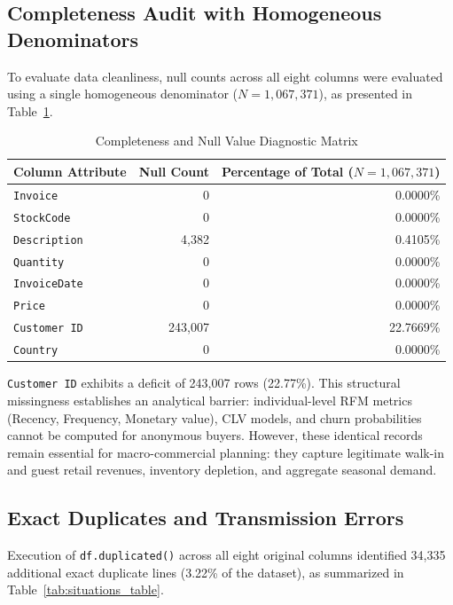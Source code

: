 \documentclass[journal,10pt,twocolumn]{IEEEtran}
\begin{document}
\subsection{Completeness Audit with Homogeneous Denominators}
To evaluate data cleanliness, null counts across all eight columns were evaluated using a single homogeneous denominator ($N = 1,067,371$), as presented in Table~\ref{tab:null_diagnostics}.

\begin{table}[htbp]
\caption{Completeness and Null Value Diagnostic Matrix}
\label{tab:null_diagnostics}
\centering
\begin{tabularx}{\columnwidth}{Xrr}
\toprule
\textbf{Column Attribute} & \textbf{Null Count} & \textbf{Percentage of Total ($N = 1,067,371$)} \\
\midrule
\texttt{Invoice} & 0 & 0.0000\% \\
\texttt{StockCode} & 0 & 0.0000\% \\
\texttt{Description} & 4,382 & 0.4105\% \\
\texttt{Quantity} & 0 & 0.0000\% \\
\texttt{InvoiceDate} & 0 & 0.0000\% \\
\texttt{Price} & 0 & 0.0000\% \\
\texttt{Customer ID} & 243,007 & 22.7669\% \\
\texttt{Country} & 0 & 0.0000\% \\
\bottomrule
\end{tabularx}
\end{table}

\texttt{Customer ID} exhibits a deficit of 243,007 rows (22.77\%). This structural missingness establishes an analytical barrier: individual-level RFM metrics (Recency, Frequency, Monetary value), CLV models, and churn probabilities cannot be computed for anonymous buyers. However, these identical records remain essential for macro-commercial planning: they capture legitimate walk-in and guest retail revenues, inventory depletion, and aggregate seasonal demand.

\subsection{Exact Duplicates and Transmission Errors}
Execution of \texttt{df.duplicated()} across all eight original columns identified 34,335 additional exact duplicate lines (3.22\% of the dataset), as summarized in Table~\ref{tab:situations_table}.
\end{document}
